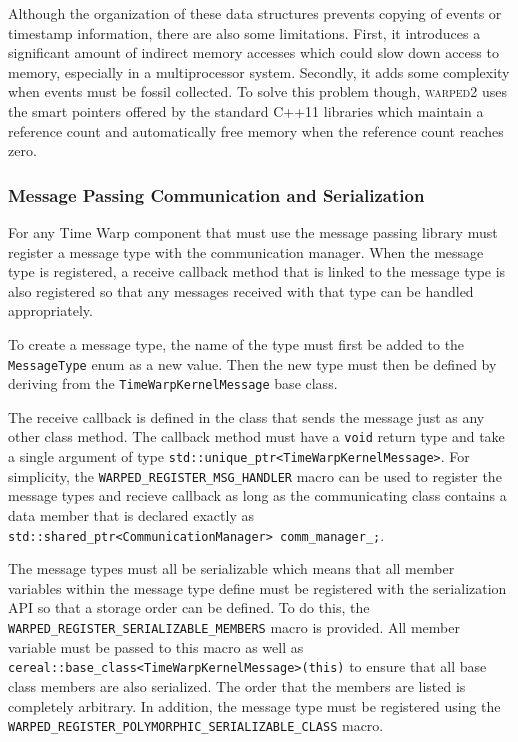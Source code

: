 \documentclass[11pt]{book}
\begin{document}
Although the organization of these data structures prevents copying of events or timestamp
information, there are also some limitations.  First, it introduces a significant amount of indirect
memory accesses which could slow down access to memory, especially in a multiprocessor system.
Secondly, it adds some complexity when events must be fossil collected.  To solve this problem
though, \textsc{warped2} uses the smart pointers offered by the standard C++11 libraries which
maintain a reference count and automatically free memory when the reference count reaches zero.

\subsubsection{Message Passing Communication and Serialization}

For any Time Warp component that must use the message passing library must register a message type
with the communication manager.  When the message type is registered, a receive callback method that
is linked to the message type is also registered so that any messages received with that type can be
handled appropriately.

To create a message type, the name of the type must first be added to the \texttt{MessageType} enum
as a new value.  Then the new type must then be defined by deriving from the
\texttt{TimeWarpKernelMessage} base class.

The receive callback is defined in the class that sends the message just as any other class method.
The callback method must have a \texttt{void} return type and take a single argument of type
\texttt{std::unique\_ptr<TimeWarpKernelMessage>}.  For simplicity, the
\texttt{WARPED\_REGISTER\_MSG\_HANDLER} macro can be used to register the message types and recieve
callback as long as the communicating class contains a data member that is declared exactly as
\texttt{std::shared\_ptr<CommunicationManager> comm\_manager\_;}.

The message types must all be serializable which means that all member variables within the message
type define must be registered with the serialization API so that a storage order can be defined.
To do this, the \texttt{WARPED\_REGISTER\_SERIALIZABLE\_MEMBERS} macro is provided.  All member
variable must be passed to this macro as well as
\texttt{cereal::base\_class<TimeWarpKernelMessage>(this)} to ensure that all base class members are
also serialized.  The order that the members are listed is completely arbitrary.  In addition, the
message type must be registered using the
\texttt{WARPED\_REGISTER\_POLYMORPHIC\_SERIALIZABLE\_CLASS} macro.
\end{document}

